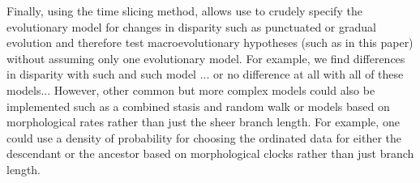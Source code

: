 \documentclass[12pt,letterpaper]{article}
\begin{document}
Finally, using the time slicing method, allows use to crudely specify the evolutionary model for changes in disparity such as punctuated or gradual evolution and therefore test macroevolutionary hypotheses (such as in this paper) without assuming only one evolutionary model.
For example, we find differences in disparity with such and such model ... or no difference at all with all of these models...
However, other common but more complex models could also be implemented such as a combined stasis and random walk \citep{Hunt21042015} or models based on morphological rates rather than just the sheer branch length.
For example, one could use a density of probability for choosing the ordinated data for either the descendant or the ancestor based on morphological clocks rather than just branch length.
\end{document}
